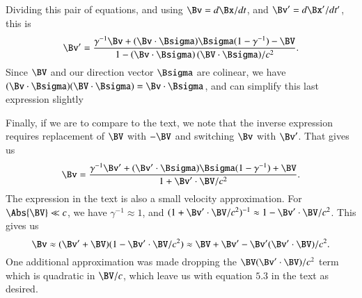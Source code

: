 {Dividing this pair of equations, and using \(\Bv = d\Bx/dt\), and \(\Bv' = d\Bx'/dt'\), this is
%
\begin{equation}\label{eqn:relativisticElectrodynamicsA1:240}
\Bv' = \frac{\gamma^{-1} \Bv + (\Bv \cdot \Bsigma) \Bsigma (1 - \gamma^{-1}) - \BV}{ 1 - \left( \Bv \cdot \Bsigma \right) (\BV \cdot \Bsigma)/c^2 }.
\end{equation}
%
Since \(\BV\) and our direction vector \(\Bsigma\) are colinear, we have \((\Bv \cdot \Bsigma) (\BV \cdot \Bsigma) = \Bv \cdot \Bsigma\), and can simplify this last expression slightly

Finally, if we are to compare to the text, we note that the inverse expression requires replacement of \(\BV\) with \(-\BV\) and switching \(\Bv\) with \(\Bv'\).  That gives us
%
\begin{equation}\label{eqn:relativisticElectrodynamicsA1:250i}
\Bv = \frac{\gamma^{-1} \Bv' + (\Bv' \cdot \Bsigma) \Bsigma (1 - \gamma^{-1}) + \BV}{ 1 + \Bv' \cdot \BV/c^2 }.
\end{equation}
%
The expression in the text is also a small velocity approximation.  For \(\Abs{\BV} \ll c\), we have \(\gamma^{-1} \approx 1\), and \((1 + \Bv' \cdot \BV/c^2)^{-1} \approx 1 - \Bv' \cdot \BV/c^2\).  This gives us
%
\begin{equation}\label{eqn:relativisticElectrodynamicsA1:250a}
\Bv \approx (\Bv' + \BV)( 1 - \Bv' \cdot \BV/c^2 ) \approx \BV + \Bv' - \Bv' (\Bv' \cdot \BV)/c^2.
\end{equation}
%
One additional approximation was made dropping the \(\BV (\Bv' \cdot \BV)/c^2\) term which is quadratic in \(\BV/c\), which leave us with equation \(5.3\) in the text as desired.
%
%

}
